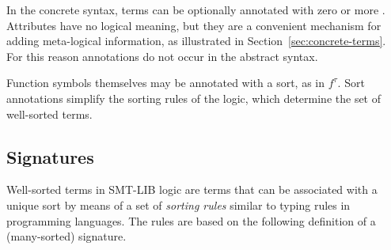 In the concrete syntax, terms can be optionally annotated with zero or
more .  
Attributes have no logical meaning, 
but they are a convenient mechanism for adding meta-logical information,
as illustrated in Section~\ref{sec:concrete-terms}.
For this reason annotations do not occur in the abstract syntax.


Function symbols themselves may be annotated with a sort, as in $f^\tau$.
Sort annotations simplify the sorting rules of the logic,
which determine the set of well-sorted terms.

\subsection{Signatures} \label{sec:signature}

Well-sorted terms in SMT-LIB logic are terms that can be associated
with a unique sort by means of a set of \emph{sorting rules}
similar to typing rules in programming languages.
The rules are based on the following definition of 
a (many-sorted) signature.

